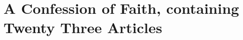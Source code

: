 \documentclass[../main.tex]{subfiles}
\begin{document}
	
	\chapter{A Confession of Faith, containing Twenty Three Articles}
	
	
	
	\theendnotes
	\setcounter{endnote}{0}
\end{document}
